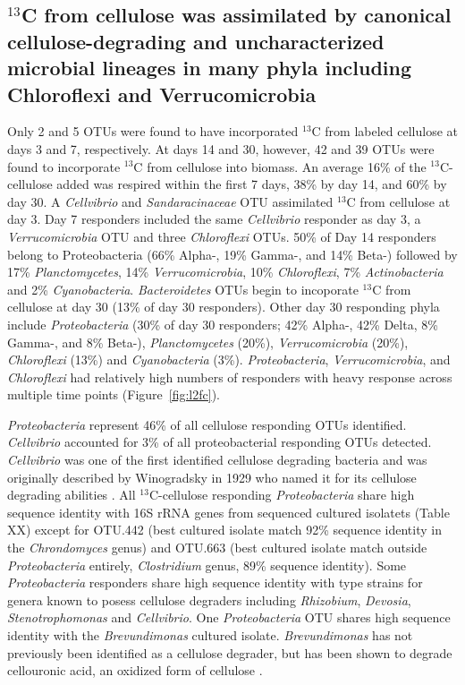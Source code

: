 \subsection{$^{13}$C from cellulose was assimilated by canonical
cellulose-degrading and uncharacterized microbial lineages in many phyla
including Chloroflexi and Verrucomicrobia} Only 2 and 5 OTUs were found to have
incorporated $^{13}$C from labeled cellulose at days 3 and 7, respectively. At
days 14 and 30, however, 42 and 39 OTUs were found to incorporate $^{13}$C from
cellulose into biomass. An average 16\% of the $^{13}$C-cellulose added was
respired within the first 7 days, 38\% by day 14, and 60\% by day 30. A
\textit{Cellvibrio} and \textit{Sandaracinaceae} OTU assimilated $^{13}$C from
cellulose at day 3. Day 7 responders included the same \textit{Cellvibrio}
responder as day 3, a \textit{Verrucomicrobia} OTU and three
\textit{Chloroflexi} OTUs. 50\% of Day 14 responders belong to Proteobacteria
(66\% Alpha-, 19\% Gamma-, and 14\% Beta-) followed by 17\%
\textit{Planctomycetes}, 14\% \textit{Verrucomicrobia}, 10\%
\textit{Chloroflexi}, 7\% \textit{Actinobacteria} and 2\%
\textit{Cyanobacteria}. \textit{Bacteroidetes} OTUs begin to incoporate
$^{13}$C from cellulose at day 30 (13\% of day 30 responders). Other day 30
responding phyla include \textit{Proteobacteria} (30\% of day 30 responders;
42\% Alpha-, 42\% Delta, 8\% Gamma-, and 8\% Beta-), \textit{Planctomycetes}
(20\%), \textit{Verrucomicrobia} (20\%), \textit{Chloroflexi} (13\%) and
\textit{Cyanobacteria} (3\%). \textit{Proteobacteria},
\textit{Verrucomicrobia}, and \textit{Chloroflexi} had relatively high numbers
of responders with heavy response across multiple time points
(Figure~\ref{fig:l2fc}).

\textit{Proteobacteria} represent 46\% of all cellulose responding OTUs
identified. \textit{Cellvibrio} accounted for 3\% of all proteobacterial
responding OTUs detected. \textit{Cellvibrio} was one of the first identified
cellulose degrading bacteria and was originally described by Winogradsky in
1929 who named it for its cellulose degrading abilities
\citep{boone2001bergeys}. All $^{13}$C-cellulose responding
\textit{Proteobacteria} share high sequence identity with 16S rRNA genes from
sequenced cultured isolatets (Table XX) except for OTU.442 (best cultured
isolate match 92\% sequence identity in the \textit{Chrondomyces} genus) and
OTU.663 (best cultured isolate match outside \textit{Proteobacteria} entirely,
\textit{Clostridium} genus, 89\% sequence identity). Some
\textit{Proteobacteria} responders share high sequence identity with type
strains for genera known to posess cellulose degraders including
\textit{Rhizobium}, \textit{Devosia}, \textit{Stenotrophomonas} and
\textit{Cellvibrio}. One \textit{Proteobacteria} OTU shares high sequence
identity with the \textit{Brevundimonas} cultured isolate.
\textit{Brevundimonas} has not previously been identified as a cellulose
degrader, but has been shown to degrade cellouronic acid, an oxidized form of
cellulose \citep{Tavernier_2008}.

